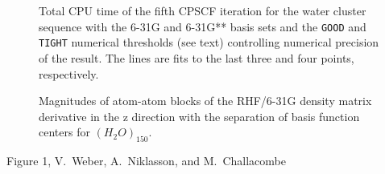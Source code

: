\documentclass[prl,aps,preprint,showpacs,superbib]{revtex4}
\begin{document}
{\begin{figure}[h]
\caption{\protect  Total CPU time of the fifth CPSCF iteration for the water cluster sequence with 
         the 6-31G and 6-31G** basis sets and the {\tt GOOD} and {\tt TIGHT} numerical thresholds (see text) 
         controlling numerical precision of the result.  The lines are fits to the last three and four points, respectively.}\label{scaling}

\caption{\protect
    Magnitudes of atom-atom blocks of the RHF/6-31G density matrix derivative
    in the z direction with the separation of basis function centers for $(H_2O)_{150}$.
}\label{fig:DPrimeZ_150_6-31G}

\end{figure}

\clearpage

\begin{center}
Figure 1, V.~Weber, A.~Niklasson,  and M.~Challacombe \\[1.cm]
\end{center}

}
\end{document}
